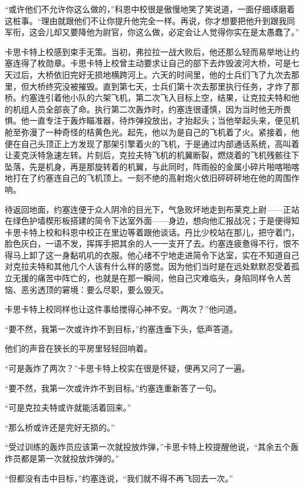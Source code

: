     “或许他们不允许你这么做的，”科恩中校很是傲慢地笑了笑说道，一面仔细琢磨着这桩事。“理由就跟他们不让你提升他完全一样。再说，你才想要把他升到跟我同军衔，这会儿却又要降他为尉官，你这么做，必定会让人觉得你实在是太愚蠢了。”

    卡思卡特上校感到束手无策。当初，弗拉拉一战大败后，他还那么轻而易举地让约塞连得了枚勋章。卡思卡特上校曾主动要求让自己的部下去炸毁波河大桥，可是七天过后，大桥依旧完好无损地横跨河上。六天的时间里，他的士兵们飞了九次去那里，但大桥终究没被摧毁。直到第七天，士兵们第十次去那里执行任务，才炸了那桥。约塞连引着他小队的六架飞机，第二次飞入目标上空，结果，让克拉夫特和他的机组人员全部丧了命。执行第二次轰炸时，约塞连很谨慎，因为当时他无所畏惧。他一直专注于轰炸瞄准器，待炸弹投放出，才抬起头；当他举起头来，便见机舱至弥漫了一种奇怪的桔黄色光。起先，他以为是自己的飞机着了火。紧接着，他便在自己头顶正上方发现了那架引擎着火的飞机，于是通过内部通话系统，高叫着让麦克沃特急速左转。片刻后，克拉夫特飞机的机翼断裂，燃烧着的飞机残骸往下坠落，先是机身，再是那旋转着的机翼，与此同时，阵雨般的金属小碎片啪喀啪喀地打在了约塞连自己的飞机顶上。一刻不绝的高射炮火依旧砰砰砰地在他的周围作响。

    待返回地面，约塞连便于众人阴冷的目光下，气急败坏地走到布莱克上尉——正站在绿色护墙楔形板搭建的简令下达室外面——身边，想向他汇报战况；于是便得知卡思卡特上校和科恩中校正在里边等着跟他谈话。丹比少校站在那儿，把守着门，脸色灰白，一语不发，挥挥手把其余的人一一支开了去。约塞连疲惫得不行，恨不得马上卸了这一身黏叽叽的衣服。他心绪不宁地走进简令下达室，实在不知道自己对克拉夫特和其他几个人该有什么样的感觉。因为他们当时是在远处默默忍受着孤立无援的痛苦中阵亡的，也就是在那一瞬间，他自己灾难临头，身陷同样令人苦恼、恶劣透顶的窘境：要么尽职，要么毁灭。

    卡思卡特上校同样也让这件事给搅得心神不安。“两次？”他问道。

    “要不然，我第一次或许炸不到目标，”约塞连垂下头，低声答道。

    他们的声音在狭长的平房里轻轻回响着。

    “可是轰炸了两次？”卡思卡特上校实在很是怀疑，便再又问了一遍。

    “要不然，我第一次或许炸不到目标。”约塞连重新答了一句。

    “可是克拉夫特或许就能活着回来。”

    “那么桥或许还是完好无损的。”

    “受过训练的轰炸员应该第一次就投放炸弹，”卡思卡特上校提醒他说，“其余五个轰炸员都是第一次就投放炸弹的。”

    “但都没有击中目标，”约塞连说，“我们就不得不再飞回去一次。”

